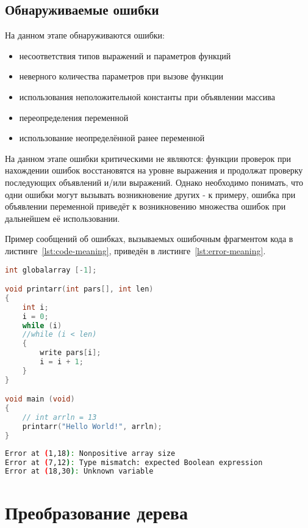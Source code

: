 \documentclass[a4paper,12pt]{report}
\numberwithin{equation}{section}
\begin{document}
\subsection{Обнаруживаемые ошибки}
На данном этапе обнаруживаются ошибки:

\begin{itemize}
  \item несоответствия типов выражений и параметров функций
  \item неверного количества параметров при вызове функции
  \item использования неположительной константы при объявлении массива
  \item переопределения переменной
  \item использование неопределённой ранее переменной
\end{itemize}

На данном этапе ошибки критическими не являются: функции проверок при нахождении ошибок восстановятся на уровне выражения и продолжат проверку последующих объявлений и/или выражений.
Однако необходимо понимать, что одни ошибки могут вызывать возникновение других - к примеру, ошибка при объявлении переменной приведёт к возникновению множества ошибок при дальнейшем её использовании.

Пример сообщений об ошибках, вызываемых ошибочным фрагментом кода в листинге~\ref{lst:code-meaning}, приведён в листинге~\ref{lst:error-meaning}.

\begin{lstlisting}[language=C,caption={Ошибочный фрагмент кода},label=lst:code-meaning]
int globalarray [-1];

void printarr(int pars[], int len)
{
    int i;
    i = 0;
    while (i)
    //while (i < len)
    {
        write pars[i];
        i = i + 1;
    }
}

void main (void)
{   
    // int arrln = 13
    printarr("Hello World!", arrln);
}
\end{lstlisting}

\begin{lstlisting}[language=bash,caption={Сообщения о смысловых ошибках},label=lst:error-meaning]
Error at (1,18): Nonpositive array size
Error at (7,12): Type mismatch: expected Boolean expression
Error at (18,30): Unknown variable
\end{lstlisting}

\section{Преобразование дерева}
\end{document}
